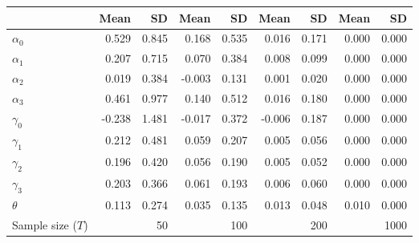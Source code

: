 
\begin{tabular}[t]{lrrrrrrrr}
\toprule
  & Mean & SD & Mean  & SD  & Mean   & SD   & Mean    & SD   \\
\midrule
$\alpha_{0}$ & 0.529 & 0.845 & 0.168 & 0.535 & 0.016 & 0.171 & 0.000 & 0.000\\
$\alpha_{1}$ & 0.207 & 0.715 & 0.070 & 0.384 & 0.008 & 0.099 & 0.000 & 0.000\\
$\alpha_{2}$ & 0.019 & 0.384 & -0.003 & 0.131 & 0.001 & 0.020 & 0.000 & 0.000\\
$\alpha_{3}$ & 0.461 & 0.977 & 0.140 & 0.512 & 0.016 & 0.180 & 0.000 & 0.000\\
$\gamma_{0}$ & -0.238 & 1.481 & -0.017 & 0.372 & -0.006 & 0.187 & 0.000 & 0.000\\
$\gamma_{1}$ & 0.212 & 0.481 & 0.059 & 0.207 & 0.005 & 0.056 & 0.000 & 0.000\\
$\gamma_{2}$ & 0.196 & 0.420 & 0.056 & 0.190 & 0.005 & 0.052 & 0.000 & 0.000\\
$\gamma_{3}$ & 0.203 & 0.366 & 0.061 & 0.193 & 0.006 & 0.060 & 0.000 & 0.000\\
$\theta$ & 0.113 & 0.274 & 0.035 & 0.135 & 0.013 & 0.048 & 0.010 & 0.000\\
Sample size ($T$) &  & 50 &  & 100 &  & 200 &  & 1000\\
\bottomrule
\end{tabular}
